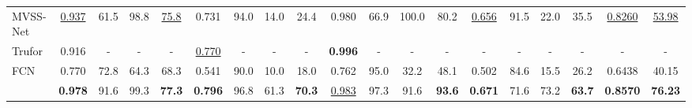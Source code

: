 \begin{table*}[ht]
{\begin{tabular}{l|cccc|cccc|cccc|cccc|cc}
MVSS-Net \cite{chen2021image}        & \underline{0.937}                            & 61.5                         & 98.8                         & \underline{75.8}                           & 0.731                         & 94.0                        & 14.0                         & 24.4                         & 0.980                         & 66.9                        & 100.0                        & 80.2                         & \underline{0.656}                            & 91.5                         & 22.0                         & 35.5                         & \underline{0.8260}                            & \underline{53.98}                            \\
Trufor \cite{guillaro2023trufor}     & 0.916                         & -                            & -                            & -                           &   \underline{0.770}                         & -                           & -                            & -                            & \textbf{0.996 }                        & -                           & -                            & -                            & -                             & -                            & -                            & -                            & -                              & -                             \\
\rowcolor[HTML]{E8E6E6} 
FCN \cite{long2015fully}             & 0.770                            & 72.8                         & 64.3                         & 68.3                        & 0.541                         & 90.0                        & 10.0                         & 18.0                         & 0.762                         & 95.0                        & 32.2                         & 48.1                         & 0.502                         & 84.6                         & 15.5                         & 26.2                         & 0.6438                         & 40.15                         \\
\rowcolor[HTML]{E8E6E6} 
\cellcolor[HTML]{E8E6E6}                              &\textbf{ 0.978  }                       & 91.6                         & 99.3                         & \textbf{77.3 }                       & \textbf{0.796 }                        & 96.8                        & 61.3                         &\textbf{ 70.3}                         & \underline{0.983}                            & 97.3                        & 91.6                         & \textbf{93.6 }                        & \textbf{0.671}                         & 71.6                         & 73.2                         &\textbf{ 63.7}                         & \textbf{0.8570 }                        & \textbf{76.23 }                           \\

\end{tabular}}
\end{table*}
